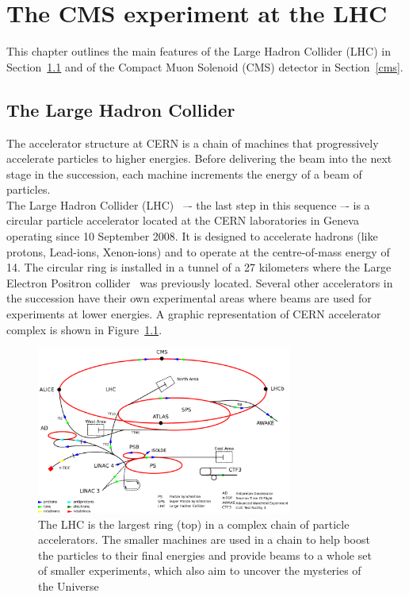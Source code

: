 \chapter{The CMS experiment at the LHC} \label{Chapter2} 



This chapter outlines the main features of the Large
Hadron Collider (LHC) in Section~\ref{lhc} and of the Compact Muon Solenoid (CMS)
detector in Section~\ref{cms}. 



\section{The Large Hadron Collider}\label{lhc}
The accelerator structure at CERN is a chain of machines that
progressively accelerate particles to higher energies. Before delivering the beam into the next stage in the succession, each machine
increments the energy of a beam of particles.\\
The Large Hadron Collider (LHC)~\cite{Brning2004LHCDR} –- the last step in this sequence –- is a circular particle accelerator
located at the CERN laboratories in Geneva operating since 10
September 2008. It is
designed to accelerate hadrons (like protons, Lead-ions, Xenon-ions) and to
operate at the centre-of-mass energy of 14\TeV.
The circular ring is installed in a tunnel of a 27 kilometers where
the Large Electron Positron collider~\cite{Lep:designReport} was
previously located. Several other accelerators in the succession have
their own experimental areas where beams are used for experiments at lower energies.
A graphic representation of CERN accelerator
complex is shown in Figure~\ref{fig:cern}. 

\begin{figure}[h]
\centering
\includegraphics[width=0.75\textwidth]{Figures/c2/Cern-accelerator-complex.png}
\vspace*{3mm}
\caption{The LHC is the largest ring (top) in a complex chain of particle accelerators. The smaller machines are used in a chain to help boost the particles to their final energies and provide beams to a whole set of smaller experiments, which also aim to uncover the mysteries of the Universe~\cite{Mobs:2197559}}
\label{fig:cern}
\end{figure}

